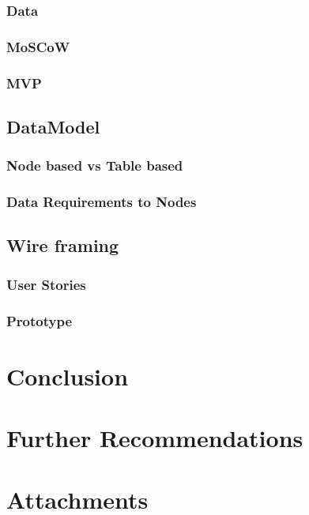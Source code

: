 \documentclass[signatures]{Thesis}
\begin{document}
		\subsection{Data}
		\subsection{MoSCoW}
		\subsection{MVP}
	\section{DataModel}
		\subsection{Node based vs Table based}
		\subsection{Data Requirements to Nodes}
	\section{Wire framing}
		\subsection{User Stories}
		\subsection{Prototype}

\chapter{Conclusion}

\chapter{Further Recommendations}

\chapter{Attachments}


\end{document}
